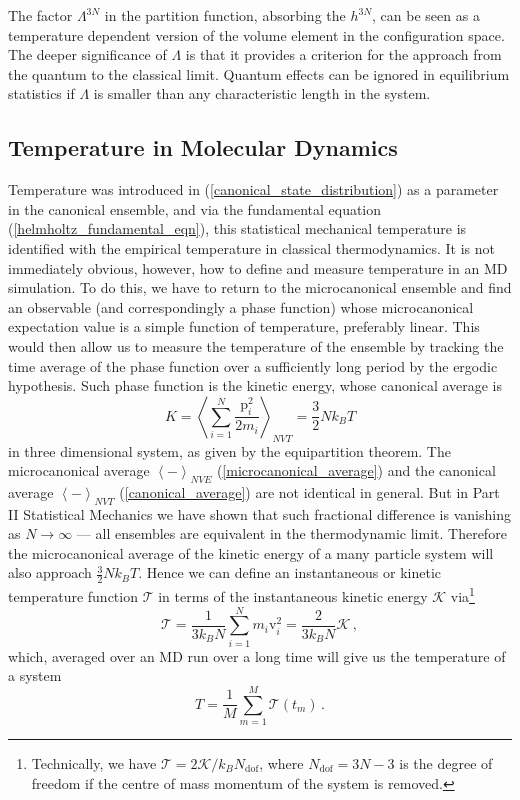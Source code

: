 \documentclass{article}
\theoremstyle{plain}\theoremheaderfont{\normalfont\itshape}\theorembodyfont{\rmfamily}\theoremseparator{.}\newtheorem*{rem}{Remark}\newtheorem*{ex}{Example}\newtheorem*{proof}{Proof}\newtheorem*{altp}{Alternative proof}
\theoremstyle{plain}\theoremheaderfont{\normalfont\bfseries}\theorembodyfont{\rmfamily}\theoremseparator{.}\newtheorem{thm}{Theorem}[section]\newtheorem{lem}[thm]{Lemma}\newtheorem{prop}[thm]{Proposition}\newtheorem*{cor}{Corollary}\newtheorem{defn}[thm]{Definition}\newtheorem{clm}[thm]{Claim}\newtheorem{clminproof}{Claim}\newtheorem{alg}[thm]{Algorithm}\newtheorem{hyp}[thm]{Hypothesis}\newtheorem{law}[thm]{Law}
\theoremstyle{break}\theoremheaderfont{\normalfont\itshape}\theorembodyfont{\rmfamily}\theoremseparator{.\medskip}\newtheorem*{proofskip}{Proof}\newtheorem*{exs}{Examples}\newtheorem*{rems}{Remarks}
\theoremstyle{break}\theoremheaderfont{\normalfont\bfseries}\theorembodyfont{\rmfamily}\theoremseparator{.\medskip}\newtheorem{lemskip}[thm]{Lemma}\newtheorem{defnskip}[thm]{Definition}\newtheorem{propskip}[thm]{Proposition}\newtheorem{thmskip}[thm]{Theorem}
\numberwithin{equation}{section}
\newcommand{\eval}[1]{\left\langle #1 \right\rangle}
\newcommand{\vb}[1]{\bm{\mathrm{#1}}}
\begin{document}
    The factor \(\Lambda^{3N}\) in the partition function, absorbing the \(h^{3N}\), can be seen as a temperature dependent version of the volume element in the configuration space. The deeper significance of \(\Lambda\) is that it provides a criterion for the approach from the quantum to the classical limit. Quantum effects can be ignored in equilibrium statistics if \(\Lambda\) is smaller than any characteristic length in the system.

    \subsection{Temperature in Molecular Dynamics}
    Temperature was introduced in (\ref{canonical_state_distribution}) as a parameter in the canonical ensemble, and via the fundamental equation (\ref{helmholtz_fundamental_eqn}), this statistical mechanical temperature is identified with the empirical temperature in classical thermodynamics. It is not immediately obvious, however, how to define and measure temperature in an MD simulation. To do this, we have to return to the microcanonical ensemble and find an observable (and correspondingly a phase function) whose microcanonical expectation value is a simple function of temperature, preferably linear. This would then allow us to measure the temperature of the ensemble by tracking the time average of the phase function over a sufficiently long period by the ergodic hypothesis. Such phase function is the kinetic energy, whose canonical average is
    \begin{equation}
        K=\eval{\sum_{i=1}^{N}\frac{\vb{p}_i^2}{2m_i}}_{NVT}=\frac{3}{2}Nk_B T
    \end{equation} 
    in three dimensional system, as given by the equipartition theorem. The microcanonical average \(\eval{-}_{NVE}\) (\ref{microcanonical_average}) and the canonical average \(\eval{-}_{NVT}\) (\ref{canonical_average}) are not identical in general. But in Part II Statistical Mechanics we have shown that such fractional difference is vanishing as \(N\to\infty\) --- all ensembles are equivalent in the thermodynamic limit. Therefore the microcanonical average of the kinetic energy of a many particle system will also approach \(\frac{3}{2}Nk_B T\). Hence we can define an instantaneous or kinetic temperature function \(\mathcal{T}\) in terms of the instantaneous kinetic energy \(\mathcal{K}\) via\footnote{Technically, we have \(\mathcal{T}=2\mathcal{K}/k_B N_{\text{dof}}\), where \(N_{\text{dof}}=3N-3\) is the degree of freedom if the centre of mass momentum of the system is removed.}
    \begin{equation}
        \mathcal{T}=\frac{1}{3k_B N}\sum_{i=1}^{N}m_i\vb{v}_i^2=\frac{2}{3k_B N}\mathcal{K}\,,
    \end{equation}
    which, averaged over an MD run over a long time will give us the temperature of a system
    \begin{equation}
        T=\frac{1}{M}\sum_{m=1}^{M}\mathcal{T}(t_m)\,.
    \end{equation}
\end{document}
